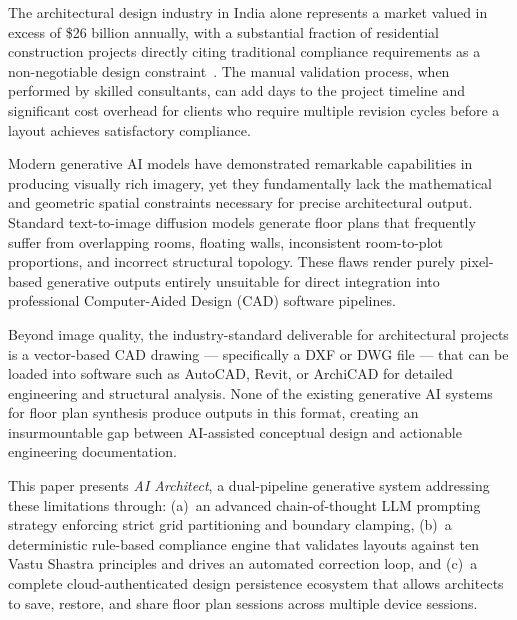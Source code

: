 \documentclass[10pt, twocolumn, letterpaper]{article}
\begin{document}
The architectural design industry in India alone represents a market valued
in excess of \$26 billion annually, with a substantial fraction of residential
construction projects directly citing traditional compliance requirements as
a non-negotiable design constraint~\cite{vastu_computational}. The manual
validation process, when performed by skilled consultants, can add days to
the project timeline and significant cost overhead for clients who require
multiple revision cycles before a layout achieves satisfactory compliance.

Modern generative AI models have demonstrated remarkable capabilities in
producing visually rich imagery, yet they fundamentally lack the mathematical
and geometric spatial constraints necessary for precise architectural output.
Standard text-to-image diffusion models generate floor plans that frequently
suffer from overlapping rooms, floating walls, inconsistent room-to-plot
proportions, and incorrect structural topology. These flaws render purely
pixel-based generative outputs entirely unsuitable for direct integration into
professional Computer-Aided Design (CAD) software pipelines.

Beyond image quality, the industry-standard deliverable for architectural
projects is a vector-based CAD drawing --- specifically a DXF or DWG file ---
that can be loaded into software such as AutoCAD, Revit, or ArchiCAD for
detailed engineering and structural analysis. None of the existing generative
AI systems for floor plan synthesis produce outputs in this format, creating
an insurmountable gap between AI-assisted conceptual design and actionable
engineering documentation.

This paper presents \textit{AI Architect}, a dual-pipeline generative system
addressing these limitations through: (a)~an advanced chain-of-thought LLM
prompting strategy enforcing strict grid partitioning and boundary clamping,
(b)~a deterministic rule-based compliance engine that validates layouts
against ten Vastu Shastra principles and drives an automated correction loop,
and (c)~a complete cloud-authenticated design persistence ecosystem that
allows architects to save, restore, and share floor plan sessions across
multiple device sessions.
\end{document}
